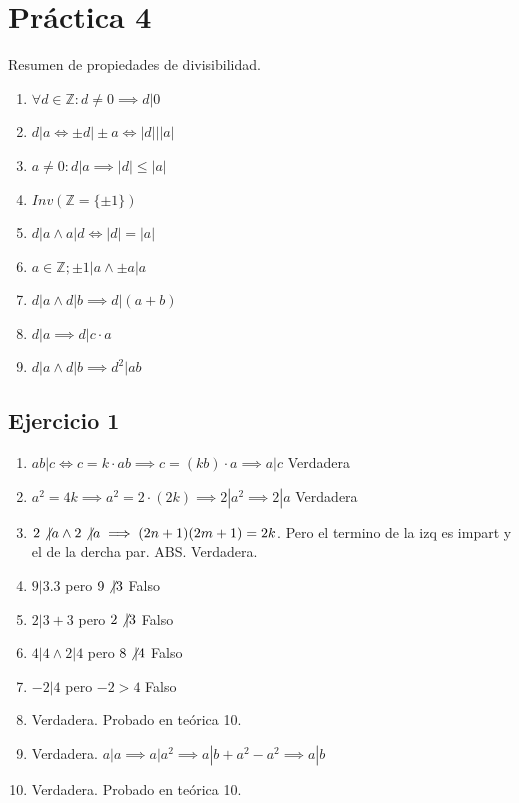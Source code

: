 \section{Práctica 4}

Resumen de propiedades de divisibilidad.
\begin{enumerate}
    \item $ \forall d \in \mathbb{Z}: d \neq 0 \implies d|0 $
    \item $ d|a \iff \pm d \vert \pm a \iff |d| \vert |a| $
    \item $ a \neq 0: d|a \implies |d| \leq |a| $
    \item $ Inv(\mathbb{Z} = \{ \pm 1 \}) $
    \item $ d|a \wedge a|d \iff |d| = |a| $
    \item $ a \in \mathbb{Z}; \pm 1 |a \wedge \pm a |a $
    \item $ d|a \wedge d|b \implies d|(a+b) $
    \item $ d|a \implies d|c\cdot a $
    \item $ d|a \wedge d|b \implies d^2 | ab $
\end{enumerate}

\subsection{Ejercicio 1}
\begin{enumerate}
    \item $ ab | c \iff  c= k \cdot ab \implies c = (kb) \cdot a \implies a | c $ Verdadera
    \item $ a^2 = 4k \implies a^2 = 2 \cdot (2k) \implies 2 | a^2 \implies 2 |a $ Verdadera
    \item $ 2 \not \vert a \wedge 2 \not \vert a \implies (2n+1)(2m+1)=2k$. Pero el termino de la izq es impart y el de la dercha par. ABS. Verdadera.
    \item $ 9|3.3 $ pero $ 9 \not \vert 3 $ Falso
    \item $ 2|3+3 $ pero $ 2 \not \vert 3 $ Falso
    \item $ 4|4 \wedge 2|4 $ pero $ 8 \not \vert 4 $ Falso
    \item $ -2|4 $ pero $ -2 > 4 $ Falso
    \item Verdadera. Probado en teórica 10.
    \item Verdadera. $ a|a \implies a |a^2 \implies a|b+a^2-a^2 \implies a|b $
    \item Verdadera. Probado en teórica 10.
\end{enumerate}

